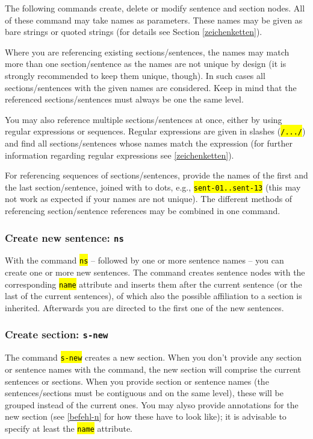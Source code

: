 \documentclass[12pt]{scrartcl}
\newcommand{\code}[1]{\hl{\texttt{#1}}}
\begin{document}
The following commands create, delete or modify sentence and section nodes.
All of these command may take names as parameters.
These names may be given as bare strings or quoted strings (for details see Section \ref{zeichenketten}).

Where you are referencing existing sections/sentences, the names may match more than one section/sentence as the names are not unique by design (it is strongly recommended to keep them unique, though).
In such cases all sections/sentences with the given names are considered. Keep in mind that the referenced sections/sentences must always be one the same level.

You may also reference multiple sections/sentences at once, either by using regular expressions or sequences.
Regular expressions are given in slashes (\code{/.../}) and find all sections/sentences whose names match the expression (for further information regarding regular expressions see \ref{zeichenketten}).

For referencing sequences of sections/sentences, provide the names of the first and the last section/sentence, joined with to dots, e.g., \code{sent-01..sent-13} (this may not work as expected if your names are not unique).
The different methods of referencing section/sentence references may be combined in one command.

\subsubsection{Create new sentence: \texttt{ns}}\label{befehl-ns}

With the command \code{ns} – followed by one or more sentence names – you can create one or more new sentences.
The command creates sentence nodes with the corresponding \code{name} attribute and inserts them after the current sentence (or the last of the current sentences), of which also the possible affiliation to a section is inherited.
Afterwards you are directed to the first one of the new sentences.

\subsubsection{Create section: \texttt{s-new}}

The command \code{s-new} creates a new section.
When you don’t provide any section or sentence names with the command, the new section will comprise the current sentences or sections.
When you provide section or sentence names (the sentences/sections must be contiguous and on the same level), these will be grouped instead of the current ones.
You may alyso provide annotations for the new section (see \ref{befehl-n} for how these have to look like); it is advisable to specify at least the \code{name} attribute.
\end{document}
